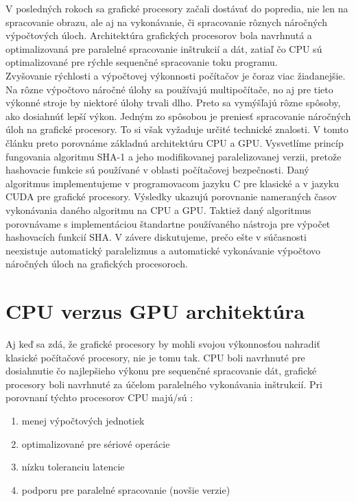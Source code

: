 \documentclass[conference]{IEEEtran}
\begin{document}
V posledných rokoch sa grafické procesory začali dostávať do popredia, nie len na spracovanie obrazu, ale aj na vykonávanie, či spracovanie rôznych náročných výpočtových úloch. Architektúra grafických procesorov bola navrhnutá a optimalizovaná pre paralelné spracovanie inštrukcií a dát, zatiaľ čo CPU sú optimalizované pre rýchle sequenčné spracovanie toku programu. \\
Zvyšovanie rýchlosti a výpočtovej výkonnosti počítačov je čoraz viac žiadanejšie. Na rôzne výpočtovo náročné úlohy sa používajú multipočítače, no aj pre tieto výkonné stroje by niektoré úlohy trvali dlho. Preto sa vymýšľajú rôzne spôsoby, ako dosiahnúť lepší výkon. Jedným zo spôsobou je preniesť spracovanie náročných úloh na grafické procesory. To si však vyžaduje určité technické znalosti. V tomto článku preto porovnáme základnú architektúru CPU a GPU. Vysvetlíme princíp fungovania algoritmu SHA-1 a jeho modifikovanej paralelizovanej verzii, pretože hashovacie funkcie sú používané v oblasti počítačovej bezpečnosti. Daný algoritmus implementujeme v programovacom jazyku C pre klasické a v jazyku CUDA pre grafické procesory. Výsledky ukazujú porovnanie nameraných časov vykonávania daného algoritmu na CPU a GPU. Taktiež daný algoritmus porovnávame s implementáciou štandartne používaného nástroja pre výpočet hashovacích funkcií SHA. V závere diskutujeme, prečo ešte v súčasnosti neexistuje automatický paralelizmus a automatické vykonávanie výpočtovo náročných úloch na grafických procesoroch.

\section{CPU verzus GPU architektúra}

Aj keď sa zdá, že grafické procesory by mohli svojou výkonnosťou nahradiť klasické počítačové procesory, nie je tomu tak. CPU boli navrhnuté pre dosiahnutie čo najlepšieho výkonu pre sequenčné spracovanie dát, grafické procesory boli navrhnuté za účelom paralelného vykonávania inštrukcií. Pri porovnaní týchto procesorov CPU majú/sú \cite{gpuRowe}:

\begin{enumerate}
	\item{menej výpočtových jednotiek}
	\item{optimalizované pre sériové operácie}
	\item{nízku toleranciu latencie}
	\item{podporu pre paralelné spracovanie (novšie verzie)}
\end{enumerate}
\end{document}
